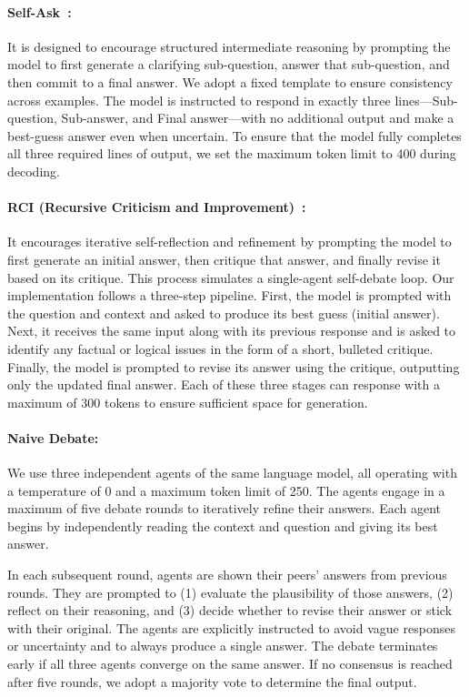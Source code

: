 \documentclass[11pt]{article}
\begin{document}
\paragraph{Self-Ask~\cite{press2022selfask}:} It is designed to encourage structured intermediate reasoning by prompting the model to first generate a clarifying sub-question, answer that sub-question, and then commit to a final answer. We adopt a fixed template to ensure consistency across examples. The model is instructed to respond in exactly three lines—Sub-question, Sub-answer, and Final answer—with no additional output and make a best-guess answer even when uncertain. To ensure that the model fully completes all three required lines of output, we set the maximum token limit to 400 during decoding. 

\paragraph{RCI (Recursive Criticism and Improvement)~\cite{kim2023language}:} It encourages iterative self-reflection and refinement by prompting the model to first generate an initial answer, then critique that answer, and finally revise it based on its critique. This process simulates a single-agent self-debate loop. Our implementation follows a three-step pipeline. First, the model is prompted with the question and context and asked to produce its best guess (initial answer). Next, it receives the same input along with its previous response and is asked to identify any factual or logical issues in the form of a short, bulleted critique. Finally, the model is prompted to revise its answer using the critique, outputting only the updated final answer. Each of these three stages can response with a maximum of 300 tokens to ensure sufficient space for generation.

\paragraph{Naive Debate:} We use three independent agents of the same language model, all operating with a temperature of 0 and a maximum token limit of 250.  The agents engage in a maximum of five debate rounds to iteratively refine their answers. Each agent begins by independently reading the context and question and giving its best answer.

In each subsequent round, agents are shown their peers' answers from previous rounds. They are prompted to (1) evaluate the plausibility of those answers, (2) reflect on their reasoning, and (3) decide whether to revise their answer or stick with their original. The agents are explicitly instructed to avoid vague responses or uncertainty and to always produce a single answer. The debate terminates early if all three agents converge on the same answer. If no consensus is reached after five rounds, we adopt a majority vote to determine the final output.
\end{document}

